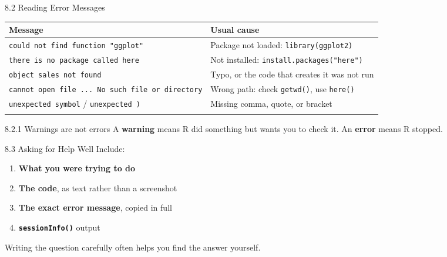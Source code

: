 \documentclass[
  ignorenonframetext,
  aspectratio=169,
]{beamer}
\newcounter{none} %
\providecommand{\tightlist}{%
  \setlength{\itemsep}{0pt}\setlength{\parskip}{0pt}}
\begin{document}
\begin{frame}[fragile]{8.2 Reading Error Messages}
\protect{}\label{reading-error-messages}
{\def\LTcaptype{none} %
\begin{longtable}[]{@{}
  >{\raggedright\arraybackslash}p{}
  >{\raggedright\arraybackslash}p{}@{}}
\toprule\noalign{}
\begin{minipage}[b]{\linewidth}\raggedright
Message
\end{minipage} & \begin{minipage}[b]{\linewidth}\raggedright
Usual cause
\end{minipage} \\
\midrule\noalign{}
\endhead
\texttt{could\ not\ find\ function\ "ggplot"} & Package not loaded:
\texttt{library(ggplot2)} \\
\texttt{there\ is\ no\ package\ called\ \textquotesingle{}here\textquotesingle{}}
& Not installed: \texttt{install.packages("here")} \\
\texttt{object\ \textquotesingle{}sales\textquotesingle{}\ not\ found} &
Typo, or the code that creates it was not run \\
\texttt{cannot\ open\ file\ ...\ No\ such\ file\ or\ directory} & Wrong
path: check \texttt{getwd()}, use \texttt{here()} \\
\texttt{unexpected\ symbol} /
\texttt{unexpected\ \textquotesingle{})\textquotesingle{}} & Missing
comma, quote, or bracket \\
\bottomrule\noalign{}
\end{longtable}
}

\begin{exampleblock}{8.2.1 Warnings are not errors}
\protect{}\label{warnings-are-not-errors}
A \textbf{warning} means R did something but wants you to check it. An
\textbf{error} means R stopped.
\end{exampleblock}
\end{frame}

\begin{frame}[fragile]{8.3 Asking for Help Well}
\protect{}\label{asking-for-help-well}
Include:

\begin{enumerate}
\tightlist
\item
  \textbf{What you were trying to do}
\item
  \textbf{The code}, as text rather than a screenshot
\item
  \textbf{The exact error message}, copied in full
\item
  \textbf{\texttt{sessionInfo()}} output
\end{enumerate}

Writing the question carefully often helps you find the answer yourself.
\end{frame}
\end{document}

